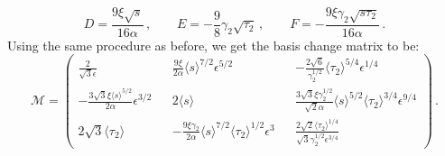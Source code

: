 \documentclass[11pt,a4paper]{article}
\begin{document}
\begin{equation}
D = \frac{9 \xi \sqrt{s}}{16 \alpha} \,, \qquad E = - \frac{9}{8} \gamma_2 \sqrt{\tau_2} \,, \qquad F = - \frac{9 \xi \gamma_2 \sqrt{s \tau_2}}{16 \alpha} \,.
\end{equation}
Using the same procedure as before, we get the basis change matrix to be:
\begin{equation}
\label{eq:RotationSMSing}
\mathcal{M} = \begin{pmatrix}
\frac{2}{\sqrt{3} \epsilon} && \frac{9 \xi}{2 \alpha} \langle s\rangle^{7/2} \epsilon^{5/2} && - \frac{2 \sqrt{6}}{\gamma_2^{1/2}} \langle\tau_2\rangle^{5/4} \epsilon^{1/4} \\
- \frac{3 \sqrt{3} \xi \langle s\rangle^{5/2}}{2 \alpha} \epsilon^{3/2} && 2 \langle s\rangle && \frac{3 \sqrt{3} \xi \gamma_2^{1/2}}{\sqrt{2} \alpha} \langle s\rangle^{5/2} \langle\tau_2\rangle^{3/4} \epsilon^{9/4} \\
2 \sqrt{3} \langle\tau_2\rangle && - \frac{9 \xi \gamma_2}{2 \alpha} \langle s\rangle^{7/2} \langle \tau_2\rangle^{1/2} \epsilon^{3} && \frac{2 \sqrt{2} \langle\tau_2\rangle^{1/4}}{\sqrt{3} \gamma_2^{1/2} \epsilon^{3/4}}
\end{pmatrix}\,.
\end{equation}
\end{document}
